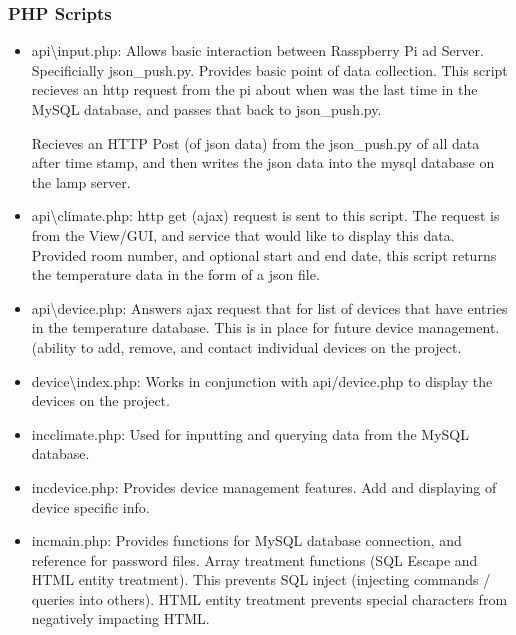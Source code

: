 \documentclass{article}
\begin{document}
			\subsubsection{PHP Scripts}		
				\begin{itemize}
					\item api\textbackslash input.php: Allows basic interaction between Rasspberry Pi ad Server. Specificially json\_push.py. Provides basic point
										  of data collection. This script recieves an http request from the pi about when was the last time in the
										  MySQL database, and passes that back to json\_push.py. 
										  
										  Recieves an HTTP Post (of json data) from the json\_push.py of all data after time stamp, and then writes the
										  json data into the mysql database on the lamp server.
										  
					\item api\textbackslash climate.php: http get (ajax) request is sent to this script. The request is from the View/GUI, and service that would 
											like to display this data. Provided room number, and optional start and end date, this script returns 
											the temperature data in the form of a json file.
					\item api\textbackslash device.php: Answers ajax request that for list of devices that have entries in the temperature database. This is
										 in place for future device management. (ability to add, remove, and contact individual devices on the
										 project.
					\item device\textbackslash index.php: Works in conjunction with api/device.php to display the devices on the project.	
					
					\item inc\textbackslach climate.php: Used for inputting and querying data from the MySQL database.  	
					
					\item inc\textbackslach device.php: Provides device management features. Add and displaying of device specific info.
					
					\item inc\textbackslach main.php: Provides functions for MySQL database connection, and reference for password files. 
													  Array treatment functions (SQL Escape and HTML entity treatment). This prevents
													  SQL inject (injecting commands / queries into others). HTML entity treatment prevents special characters 
													  from negatively impacting HTML.	
				\end{itemize}						
		
\end{document}

